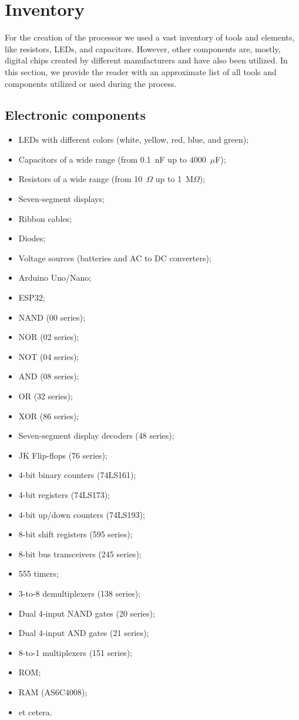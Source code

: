 \section{Inventory} \label{sec:inventory}
For the creation of the processor we used a vast inventory of tools and elements, like resistors, LEDs, and capacitors. However, other components are, mostly, digital chips created by different manufacturers and have also been utilized. In this section, we provide the reader with an approximate list of all tools and components utilized or used during the process.

\subsection{Electronic components}
\begin{itemize}
	\item LEDs with different colors (white, yellow, red, blue, and green);
	\item Capacitors of a wide range (from 0.1~nF up to 4000~$\mu$F);
	\item Resistors of a wide range (from 10~$\Omega$ up to 1~M$\Omega$);
	\item Seven-segment displays;
	\item Ribbon cables;
	\item Diodes;
	\item Voltage sources (batteries and AC to DC converters);
	\item Arduino Uno/Nano;
	\item ESP32;
	\item NAND (00 series);
	\item NOR (02 series);
	\item NOT (04 series);
	\item AND (08 series);
	\item OR (32 series);
	\item XOR (86 series);
	\item Seven-segment display decoders (48 series);
	\item JK Flip-flops (76 series);
	\item 4-bit binary counters (74LS161);
	\item 4-bit registers (74LS173);
	\item 4-bit up/down counters (74LS193);
	\item 8-bit shift registers (595 series);
	\item 8-bit bus transceivers (245 series);
	\item 555 timers;
	\item 3-to-8 demultiplexers (138 series);
	\item Dual 4-input NAND gates (20 series);
	\item Dual 4-input AND gates (21 series);
	\item 8-to-1 multiplexers (151 series);
	\item ROM;
	\item RAM (AS6C4008);
	\item et cetera. 
\end{itemize}

